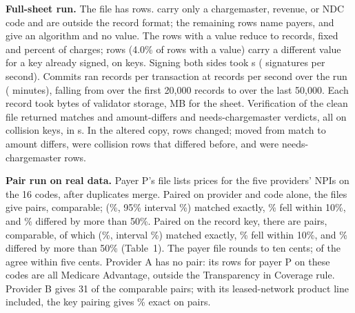 \documentclass{IOS-Book-Article}
\begin{document}
\textbf{Full-sheet run.} The file has \sheetRows{} rows. \sheetNoCode{} carry only a chargemaster, revenue, or NDC code and are outside the record format; the remaining \sheetLines{} rows name \sheetPayers{} payers, and \sheetAlgorithm{} give an algorithm and no value. The \sheetVerifyLines{} rows with a value reduce to \sheetRecords{} records, \sheetFixed{} fixed and \sheetPercent{} percent of charges; \sheetCollisions{} rows (4.0\% of rows with a value) carry a different value for a key already signed, on \sheetKeysMulti{} keys. Signing both sides took \sheetSignS{} s (\sheetSigPerS{} signatures per second). Commits ran \sheetBatch{} records per transaction at \sheetRecPerS{} records per second over the run (\sheetCommitMin{} minutes), falling from \sheetRecPerSEarly{} over the first 20,000 records to \sheetRecPerSLate{} over the last 50,000. Each record took \sheetDiskBytes{} bytes of validator storage, \sheetDiskMB{} MB for the sheet. Verification of the clean file returned \sheetCleanMatch{} matches and \sheetCleanDiffers{} amount-differs and \sheetCleanNeedsCM{} needs-chargemaster verdicts, all on collision keys, in \sheetVerifyS{} s. In the altered copy, \sheetAltered{} rows changed; \sheetCaught{} moved from match to amount differs, \sheetAlreadyDiffers{} were collision rows that differed before, and \sheetNotComparable{} were needs-chargemaster rows.

\textbf{Pair run on real data.} Payer P's file lists \pairPayerLines{} prices for the five providers' NPIs on the 16 codes, \pairPayerUnique{} after duplicates merge. Paired on provider and code alone, the files give \coarsePairs{} pairs, \coarseComparable{} comparable; \coarseExactCount{} (\coarseExact\%, 95\% interval \coarseExactCI\%) matched exactly, \coarseWithinTen\% fell within 10\%, and \coarseOverFifty\% differed by more than 50\%. Paired on the record key, there are \pairLineAll{} pairs, \pairLineComparable{} comparable, of which \pairLineExactCount{} (\pairLineExact\%, interval \pairLineExactCI\%) matched exactly, \pairLineWithinTen\% fell within 10\%, and \pairLineOverFifty\% differed by more than 50\% (Table~1). The payer file rounds to ten cents; \pairWithinFiveCents{} of the \pairLineComparable{} agree within five cents. Provider A has no pair: its rows for payer P on these codes are all Medicare Advantage, outside the Transparency in Coverage rule. Provider B gives 31 of the \pairLineComparable{} comparable pairs; with its leased-network product line included, the key pairing gives \sensAsaAllExact\% exact on \sensAsaAllComparable{} pairs.
\end{document}
